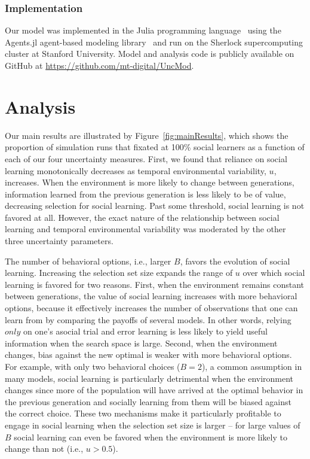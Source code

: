 \documentclass[letterpaper,11.5pt]{scrartcl}
\begin{document}
\subsubsection{Implementation}

Our model was implemented in the Julia programming language~\citep{Bezanson2017} 
using the Agents.jl agent-based modeling library~\citep{Datseris2022} and run
on the Sherlock supercomputing cluster at Stanford University. Model and analysis code is
publicly available on GitHub at \url{https://github.com/mt-digital/UncMod}.


\section{Analysis}

Our main results are illustrated by Figure~\ref{fig:mainResults}, which shows the
proportion of simulation runs that fixated at 100\% social learners as a function of
each of our four uncertainty measures.  First, we found that reliance on social
learning monotonically decreases as temporal environmental variability, $u$,
increases. When the environment is more likely to change between generations,
information learned from the previous generation is less likely to be of value,
decreasing selection for social learning. Past some threshold, social learning is
not favored at all. However, the exact nature of the relationship between social
learning and temporal environmental variability was moderated by the other three uncertainty parameters. 

The number of behavioral options, i.e., larger $B$, favors the evolution of social learning. Increasing the selection set size expands the range of $u$ over which social learning is favored for two reasons. First, when the environment remains constant between generations, the value of social learning increases with more behavioral options, because it effectively increases the number of observations that one can learn from by comparing the payoffs of several models. In other words, relying $only$ on one's asocial trial and error learning is less likely to yield useful information when the search space is large. Second, when the environment changes, bias against the new optimal is weaker with more behavioral options. For example, with only two behavioral choices ($B = 2$), a common assumption in many models, social learning is particularly detrimental when the environment changes since more of the population will have arrived at the optimal behavior in the previous generation and socially learning from them will be biased against the correct choice. These two mechanisms make it particularly profitable to engage in social learning when the selection set size is larger -- for large values of $B$ social learning can even be favored when the environment is more likely to change than not (i.e., $u>0.5$). 
\end{document}
